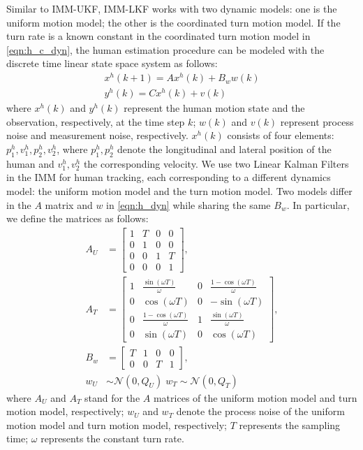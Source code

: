 \documentclass[letterpaper, 10 pt, conference]{ieeeconf}
\begin{document}
	Similar to IMM-UKF, IMM-LKF works with two dynamic models: one is the uniform motion model; the other is the coordinated turn motion model. If the turn rate is a known constant in the coordinated turn motion model in \cref{eqn:h_c_dyn}, the human estimation procedure can be modeled with the discrete time linear state space system as follows:
	\begin{subequations}
		\begin{align}
			x^h(k+1) = Ax^h(k)+B_ww(k)\label{eqn:h_dyn}\\
			y^h(k)=Cx^h(k)+v(k)\label{eqn:observation}
		\end{align}
	\end{subequations}
	where $x^h(k)$ and $y^h(k)$ represent the human motion state and the observation, respectively, at the time step $k$; $w(k)$ and $v(k)$ represent process noise and measurement noise, respectively.
	$x^h(k)$ consists of four elements: $p^h_1,v^h_1,p^h_2,v^h_2$, where $p^h_1,p^h_2$ denote the longitudinal and lateral position of the human and $v^h_1,v^h_2$ the corresponding velocity.
	We use two Linear Kalman Filters in the IMM for human tracking, each corresponding to a different dynamics model: the uniform motion model and the turn motion model.
	Two models differ in the $A$ matrix and $w$ in \cref{eqn:h_dyn} while sharing the same $B_w$.
	In particular, we define the matrices as follows:
	\begin{subequations}
		\begin{align}
			A_U&=\left[
			\begin{array}{cccc}
				1& T& 0& 0\\
				0& 1& 0& 0\\
				0& 0& 1& T\\
				0& 0& 0& 1
			\end{array}\right],\label{eqn:A_U}\\
			A_T&=\left[
			\begin{array}{cccc}
				1& \frac{\sin(\omega T)}{\omega}& 0& \frac{1-\cos(\omega T)}{\omega}\\
				0& \cos(\omega T)& 0& -\sin(\omega T)\\
				0& \frac{1-\cos(\omega T)}{\omega}& 1& \frac{\sin(\omega T)}{\omega}\\
				0& \sin(\omega T)& 0& \cos(\omega T)
			\end{array}\right],\label{eqn:A_T}\\
			B_w&=\left[
			\begin{array}{cccc}
				T& 1& 0& 0\\
				0& 0& T& 1
			\end{array}\right],\label{eqn:B_w}\\
			w_U&\sim\mathcal{N}(0,Q_U)\; w_T\sim\mathcal{N}(0,Q_T)\label{eqn:pro_noise}
		\end{align}
	\end{subequations}
	where $A_U$ and $A_T$ stand for the $A$ matrices of the uniform motion model and turn motion model, respectively; $w_U$ and $w_T$ denote the process noise of the uniform motion model and turn motion model, respectively; $T$ represents the sampling time; $\omega$ represents the constant turn rate.
	
\end{document}

